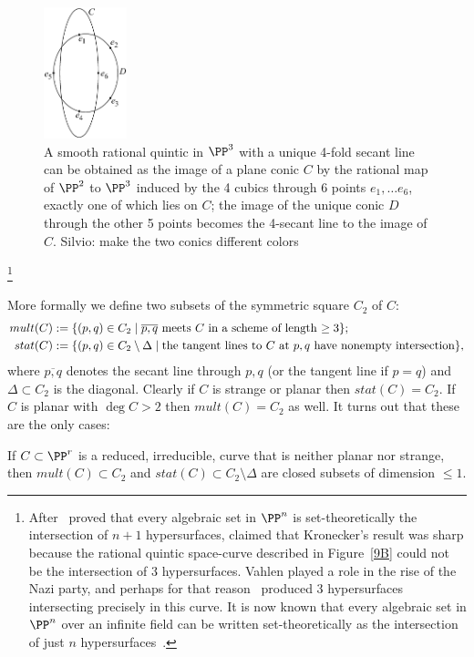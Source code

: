 \begin{figure}
\centerline {\includegraphics[height=1.5in]{"main/Fig09-2"}}
\caption{A smooth rational quintic in $\PP^{3}$ with a unique 4-fold secant line
can be obtained as the image of a plane conic $C$ by the rational map of $\PP^{2}$ to $\PP^{3}$
induced by the 4 cubics through 6 points $e_{1},\dots e_{6}$, exactly one of which lies on $C$; the image of the unique conic $D$ through the
other 5 points becomes the 4-secant line to the image of $C$. {Silvio: make the two conics different colors}}
\label{Fig9.2}
\end{figure}
\footnote{After~\cite{Kronecker} proved that every algebraic set in $\PP^{n}$ is set-theoretically the intersection of $n+1$ hypersurfaces, \cite{Vahlen} claimed that Kronecker's result was sharp because the rational quintic space-curve described in Figure~\ref{9B} could not be the intersection of 3 hypersurfaces. Vahlen played a role in the rise of the Nazi party, and perhaps for that reason~\cite{Perron} produced 3 hypersurfaces intersecting precisely in this curve. It is now known that every algebraic set in $\PP^{n}$ over an infinite field can be written set-theoretically as the intersection of just $n$ hypersurfaces~\cite{Eisenbud-Evans}.
}


More formally we define two subsets of the symmetric square $C_2$ of $C$:
$$
\begin{aligned}
 mult(C) &:=\{(p,q) \in C_2 \mid \overline{p,q} \hbox{ meets $C$ in a scheme of length $\geq 3$}\};\\
stat(C) &:= \{(p,q) \in C_2\setminus \Delta \mid  \hbox{the tangent lines to $C$ at $p,q$ have nonempty intersection}\},
\end{aligned}
$$
where $\overline{p,q}$ denotes the secant line through $p,q$ (or the tangent line if $p=q$) and $\Delta\subset C_2$
is the diagonal.
Clearly if $C$ is strange or planar then $stat(C) = C_2$. If $C$ is planar with $\deg C>2$ then $mult(C) = C_2$ as well.
It turns out that these are the only cases:

\begin{proposition}\label{mult and stat}
 If $C\subset \PP^r$ is a reduced, irreducible, curve that is neither planar nor strange, then $mult(C)\subset C_2$
 and $stat(C)\subset C_2\setminus \Delta$ are closed subsets of dimension $\leq 1$.
\end{proposition}

